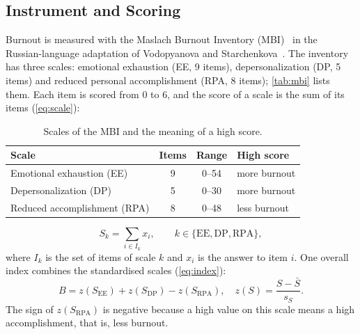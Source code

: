 \subsection{Instrument and Scoring}\label{sec:instrument}
Burnout is measured with the Maslach Burnout Inventory
(MBI)~\cite{maslach1981mbi,maslach2001job} in the Russian-language adaptation
of Vodopyanova and Starchenkova~\cite{vodopyanova2008burnout}. The inventory
has three scales: emotional exhaustion (EE, 9 items), depersonalization (DP, 5
items) and reduced personal accomplishment (RPA, 8 items); \autoref{tab:mbi} lists
them. Each item is scored from 0 to 6, and the score of a scale is the sum of
its items (\autoref{eq:scale}):
\begin{table}[b]
  \centering
  \caption{Scales of the MBI and the meaning of a high score.}
  \label{tab:mbi}
  \footnotesize
  \setlength{\tabcolsep}{3pt}
  \begin{tabular}{@{}lccl@{}}
    \toprule
    Scale & Items & Range & High score \\
    \midrule
    Emotional exhaustion (EE) & 9 & 0--54 & more burnout \\
    Depersonalization (DP) & 5 & 0--30 & more burnout \\
    Reduced accomplishment (RPA) & 8 & 0--48 & less burnout \\
    \bottomrule
  \end{tabular}
\end{table}
\begin{equation}
  S_k = \sum_{i \in I_k} x_i, \qquad k \in \{\mathrm{EE},\mathrm{DP},\mathrm{RPA}\},
  \label{eq:scale}
\end{equation}
where $I_k$ is the set of items of scale $k$ and $x_i$ is the answer to item
$i$. One overall
index combines the standardised scales (\autoref{eq:index}):
\begin{equation}
  B = z(S_{\mathrm{EE}}) + z(S_{\mathrm{DP}}) - z(S_{\mathrm{RPA}}),
  \quad z(S) = \frac{S - \bar{S}}{s_S}.
  \label{eq:index}
\end{equation}
The sign of $z(S_{\mathrm{RPA}})$ is negative because a high value on this
scale means a high accomplishment, that is, less burnout.

